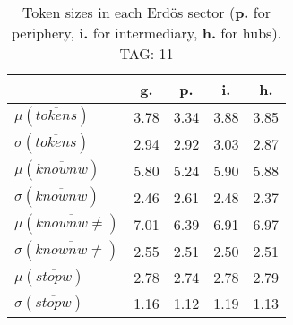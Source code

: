 \begin{table}[h!]
\begin{center}
\begin{tabular}{| l || c | c | c | c |}\hline
 & {\bf g.} & {\bf p.} & {\bf i.} & {\bf h.} \\\hline\hline
$\mu(\overline{tokens})$ & 3.78  & 3.34  & 3.88  & 3.85 \\
$\sigma(\overline{tokens})$ & 2.94  & 2.92  & 3.03  & 2.87 \\\hline
$\mu(\overline{knownw})$ & 5.80  & 5.24  & 5.90  & 5.88 \\
$\sigma(\overline{knownw})$ & 2.46  & 2.61  & 2.48  & 2.37 \\\hline
$\mu(\overline{knownw \neq})$ & 7.01  & 6.39  & 6.91  & 6.97 \\
$\sigma(\overline{knownw \neq})$ & 2.55  & 2.51  & 2.50  & 2.51 \\\hline
$\mu(\overline{stopw})$ & 2.78  & 2.74  & 2.78  & 2.79 \\
$\sigma(\overline{stopw})$ & 1.16  & 1.12  & 1.19  & 1.13 \\\hline
\end{tabular}
\caption{Token sizes in each Erd\"os sector ({{\bf p.}} for periphery, {{\bf i.}} for intermediary, {{\bf h.}} for hubs). TAG: 11}
\end{center}
\end{table}